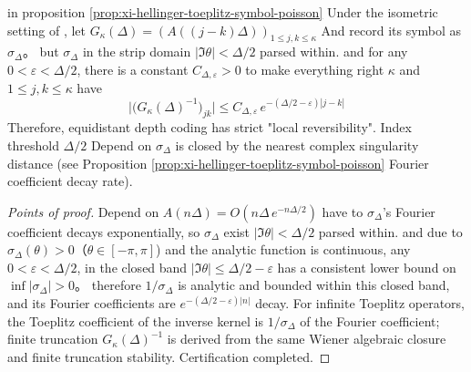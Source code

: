 \begin{proposition}\label{prop:xi-hellinger-toeplitz-inverse-localization}
in proposition \ref{prop:xi-hellinger-toeplitz-symbol-poisson} Under the isometric setting of , let
\(
G_\kappa(\Delta)=(A((j-k)\Delta))_{1\le j,k\le \kappa}
\)
And record its symbol as \(\sigma_\Delta\)。
but \(\sigma_\Delta\) in the strip domain \(|\Im\theta|<\Delta/2\) parsed within.
and for any \(0<\varepsilon<\Delta/2\), there is a constant \(C_{\Delta,\varepsilon}>0\) to make everything right \(\kappa\) and \(1\le j,k\le\kappa\) have
\[
\boxed{\;
\bigl|\bigl(G_\kappa(\Delta)^{-1}\bigr)_{jk}\bigr|
\le C_{\Delta,\varepsilon}\,e^{-(\Delta/2-\varepsilon)|j-k|}\;}
\]
Therefore, equidistant depth coding has strict "local reversibility".
Index threshold \(\Delta/2\) Depend on \(\sigma_\Delta\) is closed by the nearest complex singularity distance (see Proposition \ref{prop:xi-hellinger-toeplitz-symbol-poisson} Fourier coefficient decay rate).
\end{proposition}
\begin{proof}[Points of proof]
Depend on \(A(n\Delta)=O(n\Delta\,e^{-n\Delta/2})\) have to \(\sigma_\Delta\)’s Fourier coefficient decays exponentially, so \(\sigma_\Delta\) exist \(|\Im\theta|<\Delta/2\) parsed within.
and due to \(\sigma_\Delta(\theta)>0\)（\(\theta\in[-\pi,\pi]\)) and the analytic function is continuous, any \(0<\varepsilon<\Delta/2\), in the closed band \(|\Im\theta|\le \Delta/2-\varepsilon\) has a consistent lower bound on \(\inf|\sigma_\Delta|>0\)。
therefore \(1/\sigma_\Delta\) is analytic and bounded within this closed band, and its Fourier coefficients are \(e^{-(\Delta/2-\varepsilon)|n|}\) decay.
For infinite Toeplitz operators, the Toeplitz coefficient of the inverse kernel is \(1/\sigma_\Delta\) of the Fourier coefficient; finite truncation \(G_\kappa(\Delta)^{-1}\) is derived from the same Wiener algebraic closure and finite truncation stability. Certification completed.
\end{proof}

